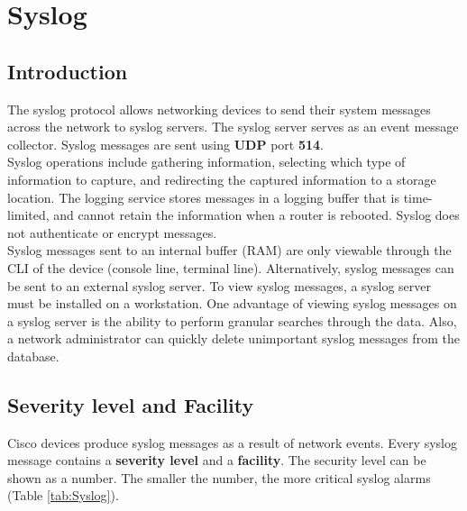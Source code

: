 \section{Syslog}

\subsection{Introduction}

The syslog protocol allows networking devices to send their system messages across the network to syslog servers. The syslog server serves as an event message collector. Syslog messages are sent using \textbf{UDP} port \textbf{514}.\\

Syslog operations include gathering information, selecting which type of information to capture, and redirecting the captured information to a storage location. The logging service stores messages in a logging buffer that is time-limited, and cannot retain the information when a router is rebooted. Syslog does not authenticate or encrypt messages.\\

Syslog messages sent to an internal buffer (RAM) are only viewable through the CLI of the device (console line, terminal line). Alternatively, syslog messages can be sent to an external syslog server. To view syslog messages, a syslog server must be installed on a workstation. One advantage of viewing syslog messages on a syslog server is the ability to perform granular searches through the data. Also, a network administrator can quickly delete unimportant syslog messages from the database.

\subsection{Severity level and Facility}
Cisco devices produce syslog messages as a result of network events. Every syslog message contains a \textbf{severity level} and a \textbf{facility}. The security level can be shown as a number. The smaller the number, the more critical syslog alarms (Table \ref{tab:Syslog}).\\

